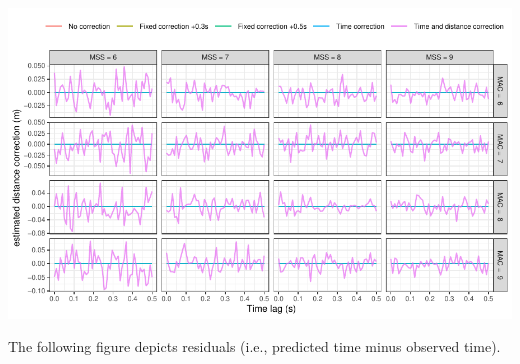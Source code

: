 \documentclass[fleqn,10pt,lineno]{wlpeerj} %
\begin{document}
\begin{center}\includegraphics[width=1\linewidth]{paper_files/figure-latex/unnamed-chunk-53-1} \end{center}

The following figure depicts residuals (i.e., predicted time minus observed time).
\end{document}
